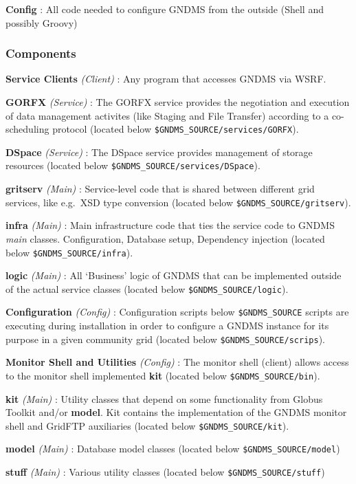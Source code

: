 \documentclass{article}
\begin{document}
\textbf{Config} : All code needed to configure GNDMS from the
outside (Shell and possibly Groovy)

\subsubsection{Components}

\textbf{Service Clients} \emph{(Client)} : Any program that
accesses GNDMS via WSRF.

\textbf{GORFX} \emph{(Service)} : The GORFX service provides the
negotiation and execution of data management activites (like
Staging and File Transfer) according to a co-scheduling protocol
(located below \verb!$GNDMS_SOURCE/services/GORFX!).

\textbf{DSpace} \emph{(Service)} : The DSpace service provides
management of storage resources (located below
\verb!$GNDMS_SOURCE/services/DSpace!).

\textbf{gritserv} \emph{(Main)} : Service-level code that is shared
between different grid services, like e.g.~XSD type conversion
(located below \verb!$GNDMS_SOURCE/gritserv!).

\textbf{infra} \emph{(Main)} : Main infrastructure code that ties
the service code to GNDMS \emph{main} classes. Configuration,
Database setup, Dependency injection (located below
\verb!$GNDMS_SOURCE/infra!).

\textbf{logic} \emph{(Main)} : All `Business' logic of GNDMS that
can be implemented outside of the actual service classes (located
below \verb!$GNDMS_SOURCE/logic!).

\textbf{Configuration} \emph{(Config)} : Configuration scripts
below \verb!$GNDMS_SOURCE! scripts are executing during
installation in order to configure a GNDMS instance for its purpose
in a given community grid (located below
\verb!$GNDMS_SOURCE/scrips!).

\textbf{Monitor Shell and Utilities} \emph{(Config)} : The monitor
shell (client) allows access to the monitor shell implemented
\textbf{kit} (located below \verb!$GNDMS_SOURCE/bin!).

\textbf{kit} \emph{(Main)} : Utility classes that depend on some
functionality from Globus Toolkit and/or \textbf{model}. Kit
contains the implementation of the GNDMS monitor shell and GridFTP
auxiliaries (located below \verb!$GNDMS_SOURCE/kit!).

\textbf{model} \emph{(Main)} : Database model classes (located
below \verb!$GNDMS_SOURCE/model!)

\textbf{stuff} \emph{(Main)} : Various utility classes (located
below \verb!$GNDMS_SOURCE/stuff!)
\end{document}
